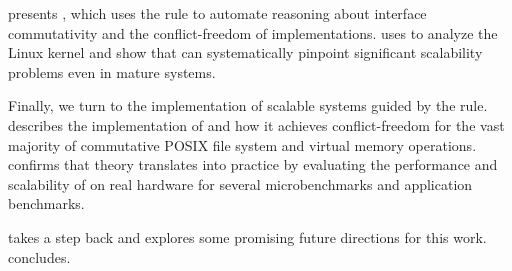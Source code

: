  presents \tool, which uses the rule to automate
reasoning about interface commutativity and the conflict-freedom of
implementations.   uses \tool to analyze the Linux
kernel and show that \tool can systematically pinpoint
significant scalability problems even in mature systems.

Finally, we turn to the implementation of scalable systems guided by
the rule.   describes the implementation of \sys and how
it achieves conflict-freedom for the vast majority of commutative
POSIX file system and virtual memory operations.  
confirms that theory translates into practice by evaluating the
performance and scalability of \sys on real hardware for several
microbenchmarks and application benchmarks.

 takes a step back and explores some promising
future directions for this work.   concludes.



